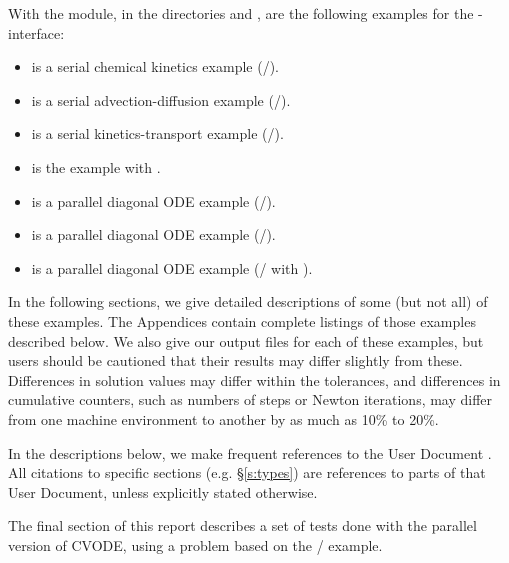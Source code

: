With the {\fcvode} module, in the directories 
 and
, are the following examples for
the {\F}-{\C} interface:
\begin{itemize}
\item {} is a serial chemical kinetics example (/{\dense}).
\item {} is a serial advection-diffusion example (/{\band}).
\item {} is a serial kinetics-transport example (/{\spgmr}).
\item {} is the  example with {\fcvbp}.
\item {} is a parallel diagonal ODE example
       (/).
\item {} is a parallel diagonal ODE example (/{\spgmr}).
\item {} is a parallel diagonal ODE example (/{\spgmr} with 
  {\fcvbbd}).
\end{itemize}

In the following sections, we give detailed descriptions of some (but
not all) of these examples.  The Appendices contain complete listings
of those examples described below.  We also give our output files for
each of these examples, but users should be cautioned that their
results may differ slightly from these.  Differences in solution
values may differ within the tolerances, and differences in cumulative
counters, such as numbers of steps or Newton iterations, may differ
from one machine environment to another by as much as 10\% to 20\%.

In the descriptions below, we make frequent references to the {\cvode}
User Document \cite{cvode2.1_ug}.  All citations to specific sections
(e.g. \S\ref{s:types}) are references to parts of that User Document, unless
explicitly stated otherwise.

The final section of this report describes a set of tests done with the
parallel version of CVODE, using a problem based on the /
example.
